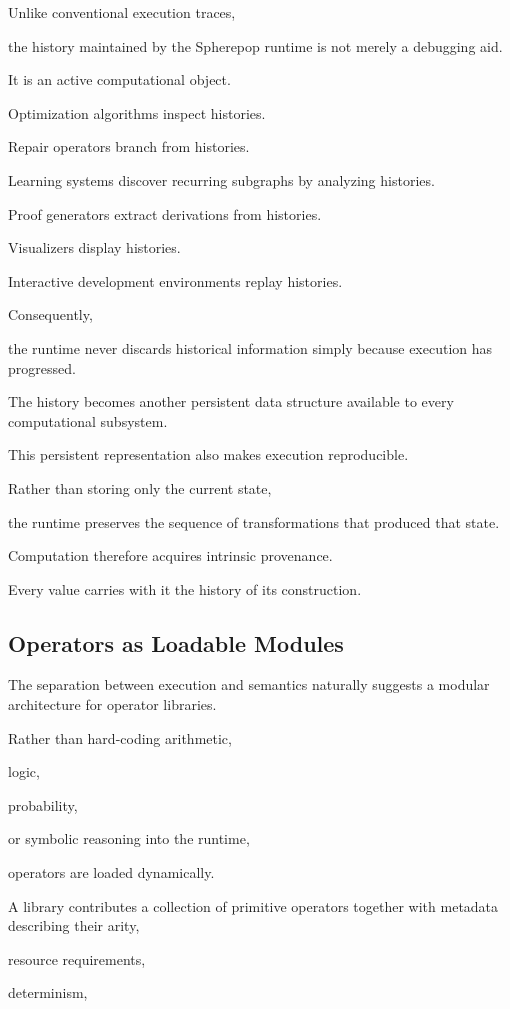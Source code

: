\documentclass[12pt,oneside]{article}
\begin{document}
Unlike conventional execution traces,

the history maintained by the Spherepop runtime is not merely a debugging aid.

It is an active computational object.

Optimization algorithms inspect histories.

Repair operators branch from histories.

Learning systems discover recurring subgraphs by analyzing histories.

Proof generators extract derivations from histories.

Visualizers display histories.

Interactive development environments replay histories.

Consequently,

the runtime never discards historical information simply because execution has progressed.

The history becomes another persistent data structure available to every computational subsystem.

This persistent representation also makes execution reproducible.

Rather than storing only the current state,

the runtime preserves the sequence of transformations that produced that state.

Computation therefore acquires intrinsic provenance.

Every value carries with it the history of its construction.

\subsection{Operators as Loadable Modules}

The separation between execution and semantics naturally suggests a modular architecture for operator libraries.

Rather than hard-coding arithmetic,

logic,

probability,

or symbolic reasoning into the runtime,

operators are loaded dynamically.

A library contributes a collection of primitive operators together with metadata describing their arity,

resource requirements,

determinism,
\end{document}
